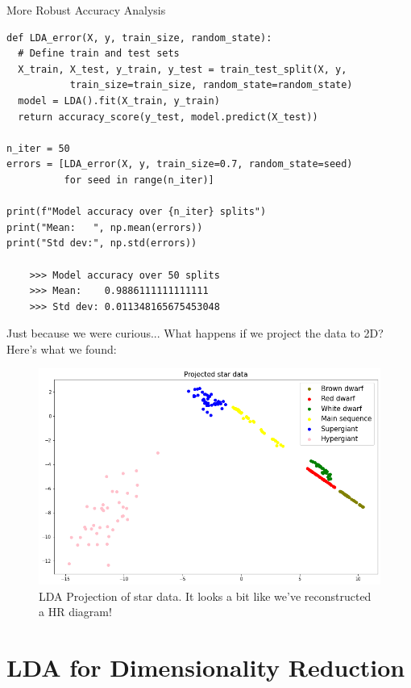 \documentclass[9pt]{beamer}
\begin{document}
\begin{frame}[fragile]{More Robust Accuracy Analysis}
    \begin{verbatim}
def LDA_error(X, y, train_size, random_state):
  # Define train and test sets
  X_train, X_test, y_train, y_test = train_test_split(X, y, 
           train_size=train_size, random_state=random_state)
  model = LDA().fit(X_train, y_train)
  return accuracy_score(y_test, model.predict(X_test))

n_iter = 50
errors = [LDA_error(X, y, train_size=0.7, random_state=seed) 
          for seed in range(n_iter)]

print(f"Model accuracy over {n_iter} splits")
print("Mean:   ", np.mean(errors))
print("Std dev:", np.std(errors))

    >>> Model accuracy over 50 splits
    >>> Mean:    0.9886111111111111
    >>> Std dev: 0.011348165675453048
\end{verbatim}
\end{frame}

\begin{frame}{Just because we were curious...}
    What happens if we project the data to 2D? Here's what we found:
    \begin{figure}
        \centering
        \includegraphics[scale=0.35]{hr_lda.png}
        \caption{LDA Projection of star data. It looks a bit like we've reconstructed a HR diagram!}
        \label{fig:lda_star_red}
    \end{figure}
\end{frame}

\section{LDA for Dimensionality Reduction}
\frame{\sectionpage}
\end{document}
